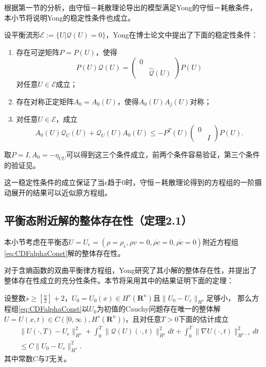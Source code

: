 根据第一节的分析，由守恒－耗散理论导出的模型满足Yong的守恒－耗散条件，本小节将说明Yong的稳定性条件也成立。

设平衡流形$\mathcal{E}:=\{U|\mathcal{Q}(U)=0\}$，Yong在博士论文\cite{yong1992singular}中提出了下面的稳定性条件：
	\begin{enumerate}
		\item 存在可逆矩阵$P=P(U)$，使得
			\begin{equation*}
				P(U)\mathcal{Q}(U) = \left( \begin{matrix}
				0 & \\
				& \hat{\mathcal{Q}}(U) 
				\end{matrix} \right) P(U)
			\end{equation*}
			对任意$U \in \mathcal{E}$成立；
		\item 存在对称正定矩阵$A_0=A_0(U)$，使得$A_0(U)A_j(U)$对称；
		\item 对任意$U \in \mathcal{E}$，成立
		\begin{equation} \label{eq:yongstability}
			A_0(U) \mathcal{Q}_U(U) +\mathcal{Q}_U(U) A_0(U) \le  - P^T(U) \left(\begin{matrix} 0 & \\ & I \end{matrix} \right) P(U). 
		\end{equation}
	\end{enumerate}
取$P=I,A_0 = -\eta_{UU}$可以得到这三个条件成立，前两个条件容易验证，第三个条件的验证见\cite{yong2008interesting}。%

这一稳定性条件的成立保证了当$\epsilon$趋于$0$时，守恒－耗散理论得到的方程组的一阶摄动展开的结果可以近似原方程组。

	\subsection{平衡态附近解的整体存在性（定理2.1）}
	本小节考虑在平衡态$U=U_e = (\rho = \rho_e, \rho v = 0, \rho \dot{c} = 0, \rho \mathring{c} =0)$附近方程组\eqref{eq:CDFalphaConst}解的整体存在性。  

	对于含熵函数的双曲平衡律方程组，Yong研究了其小解的整体存在性\cite{yong2004entropy}，并提出了整体存在性成立的充分性条件。本节将采用其中的结果证明下面的定理：
	\begin{theorem} \label{th:Kawashima}
		设整数$s \ge [\frac{n}{2}]+2$，$U_0 = U_0(x) \in H^s(\mathbf{R}^n)$且$\|U_0 -U_e\|_{H^s}$足够小，
		那么方程组\eqref{eq:CDFalphaConst}以$U_0$为初值的Cauchy问题存在唯一的整体解$U=U(x,t) \in C([0,\infty),H^s(\mathbf{R}^n))$，且对任意$T>0$下面的估计成立
		\begin{eqnarray*}
			&& \|U(\cdot,T) - U_e \|_{H^s}^2 + \int_0^T \| \mathcal{Q}(U)(\cdot,t)\|_{H^s}^2 dt + \int_0^T \|\nabla U (\cdot,t)\|_{H^{s-1}}^2 dt \\
			&& \le C \| U_0 -U_e\|_{H^s}^2.
		\end{eqnarray*}
		其中常数$C$与$T$无关。
	\end{theorem}

